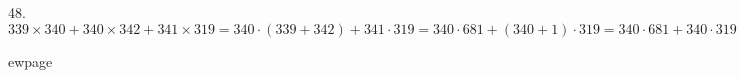 48. $339 \times 340 + 340 \times 342 + 341 \times 319=
340\cdot(339+342)+341\cdot319=340\cdot681+(340+1)\cdot319=
340\cdot681+340\cdot319+1\cdot319=340\cdot(681+319)+319=
340\cdot1000+319=340319.$

ewpage

